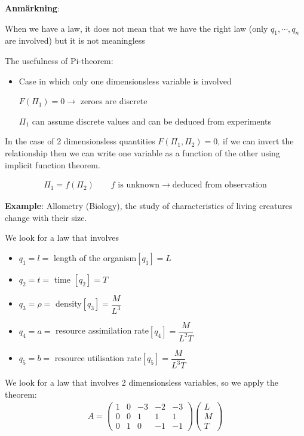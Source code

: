 \par\bigskip
\noindent\textbf{Anmärkning}:\par
\noindent When we have a law, it does not mean that we have the right law (only $q_1,\cdots,q_n$ are involved) but it is not meaningless
\par\bigskip
\noindent The usefulness of Pi-theorem:\par
\begin{itemize}
  \item Case in which only one dimensionsless variable is involved\par
    $F(\Pi_1) = 0\rightarrow$ zeroes are discrete\par
    $\Pi_1$ can assume discrete values and can be deduced from experiments
\end{itemize}
\par\bigskip
\noindent In the case of 2 dimensionsless quantities $F(\Pi_1,\Pi_2) = 0$, if we can invert the relationship then we can write one variable as a function of the other using implicit function theorem.
\par\bigskip
\begin{equation*}
  \begin{gathered}
    \Pi_1 = f(\Pi_2)\qquad\text{$f$ is unknown}\rightarrow\text{deduced from observation}
  \end{gathered}
\end{equation*}
\par\bigskip
\noindent\textbf{Example}: Allometry (Biology), the study of characteristics of living creatures change with their size. \par
\noindent We look for a law that involves\par
\begin{itemize}
  \item $q_1 = l = $ length of the organism\qquad $[q_1] = L$
  \item $q_2 = t = $ time \qquad $[q_2] = T$
  \item $q_3 = \rho = $ density\qquad $[q_3] = \dfrac{M}{L^3}$
  \item $q_4 = a = $ resource assimilation rate\qquad$[q_4] = \dfrac{M}{L^2T}$
  \item $q_5 = b = $ resource utilisation rate\qquad $[q_5] = \dfrac{M}{L^3T}$
\end{itemize}
\par\bigskip
\noindent We look for a law that involves 2 dimensionsless variables, so we apply the theorem:
\begin{equation*}
  \begin{gathered}
    A = \begin{pmatrix}1&0&-3&-2&-3\\0&0&1&1&1\\0&1&0&-1&-1\end{pmatrix}\begin{pmatrix}L\\M\\T\end{pmatrix}
  \end{gathered}
\end{equation*}\par
